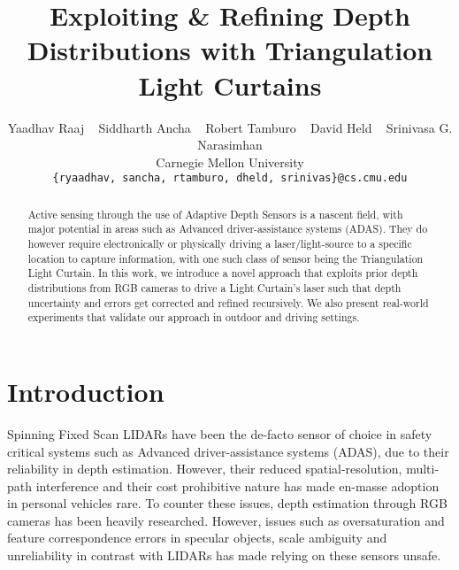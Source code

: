 \documentclass[review]{cvpr}
\begin{document}
\title{Exploiting \& Refining Depth Distributions with Triangulation Light Curtains}

\author{Yaadhav Raaj ~ Siddharth Ancha ~ Robert Tamburo ~ David Held ~ Srinivasa G. Narasimhan\\
Carnegie Mellon University\\
{\tt\small \{ryaadhav, sancha, rtamburo, dheld, srinivas\}@cs.cmu.edu}
}


\maketitle

\begin{abstract}
Active sensing through the use of Adaptive Depth Sensors is a nascent field, with major potential in areas such as Advanced driver-assistance systems (ADAS). They do however require electronically or physically driving a laser/light-source to a specific location to capture information, with one such class of sensor being the Triangulation Light Curtain. In this work, we introduce a novel approach  that exploits prior depth distributions from RGB cameras to drive a Light Curtain's laser such that depth uncertainty and errors get corrected and refined recursively. We also present real-world experiments that validate our approach in outdoor and driving settings.
\end{abstract}

\vspace{-.1in}
\section{Introduction}

Spinning Fixed Scan LIDARs have been the de-facto sensor of choice in safety critical systems such as Advanced driver-assistance systems (ADAS), due to their reliability in depth estimation. However, their reduced spatial-resolution, multi-path interference and their cost prohibitive nature has made en-masse adoption in personal vehicles rare. To counter these issues, depth estimation through RGB cameras has been heavily researched. However, issues such as oversaturation and feature correspondence errors in specular objects, scale ambiguity and unreliability in contrast with LIDARs has made relying on these sensors unsafe.
\end{document}
